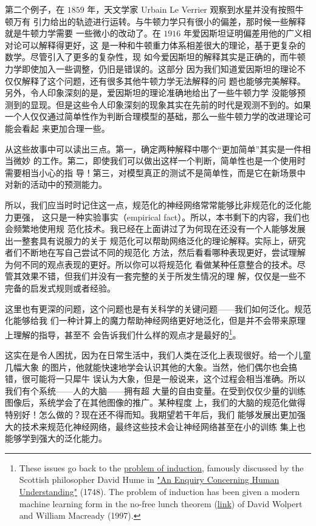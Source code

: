 第二个例子，在 $1859$ 年，天文学家 Urbain Le Verrier 观察到水星并没有按照牛顿万有
引力给出的轨迹进行运转。与牛顿力学只有很小的偏差，那时候一些解释就是牛顿力学需要
一些微小的改动了。在 $1916$ 年爱因斯坦证明偏差用他的广义相对论可以解释得更好，这
是一种和牛顿重力体系相差很大的理论，基于更复杂的数学。尽管引入了更多的复杂性，现
如今爱因斯坦的解释其实是正确的，而牛顿力学即使加入一些调整，仍旧是错误的。这部分
因为我们知道爱因斯坦的理论不仅仅解释了这个问题，还有很多其他牛顿力学无法解释的问
题也能够完美解释。另外，令人印象深刻的是，爱因斯坦的理论准确地给出了一些牛顿力学
没能够预测到的显现。但是这些令人印象深刻的现象其实在先前的时代是观测不到的。如果
一个人仅仅通过简单性作为判断合理模型的基础，那么一些牛顿力学的改进理论可能会看起
来更加合理一些。

从这些故事中可以读出三点。第一，确定两种解释中哪个“更加简单”其实是一件相当微妙
的工作。第二，即使我们可以做出这样一个判断，简单性也是一个使用时需要相当小心的指
导！第三，对模型真正的测试不是简单性，而是它在新场景中对新的活动中的预测能力。

所以，我们应当时时记住这一点，规范化的神经网络常常能够比非规范化的泛化能力更强，
这只是一种实验事实（empirical fact）。所以，本书剩下的内容，我们也会频繁地使用规
范化技术。我已经在上面讲过了为何现在还没有一个人能够发展出一整套具有说服力的关于
规范化可以帮助网络泛化的理论解释。实际上，研究者们不断地在写自己尝试不同的规范化
方法，然后看看哪种表现更好，尝试理解为何不同的观点表现的更好。所以你可以将规范化
看做某种任意整合的技术。尽管其效果不错，但我们并没有一套完整的关于所发生情况的理
解，仅仅是一些不完备的启发式规则或者经验。

这里也有更深的问题，这个问题也是有关科学的关键问题——我们如何泛化。规范化能够给我
们一种计算上的魔力帮助神经网络更好地泛化，但是并不会带来原理上理解的指导，甚至不
会告诉我们什么样的观点才是最好的\footnote{These issues go back to the
  \href{http://en.wikipedia.org/wiki/Problem_of_induction}{problem of
    induction}, famously discussed by the Scottish philosopher David Hume in
  \href{http://www.gutenberg.org/ebooks/9662}{"An Enquiry Concerning Human
    Understanding"} (1748). The problem of induction has been given a modern
  machine learning form in the no-free lunch theorem
  (\href{http://ieeexplore.ieee.org/xpl/articleDetails.jsp?tp=&arnumber=585893}{link})
  of David Wolpert and William Macready (1997).}。

这实在是令人困扰，因为在日常生活中，我们人类在泛化上表现很好。给一个儿童几幅大象
的图片，他就能快速地学会认识其他的大象。当然，他们偶尔也会搞错，很可能将一只犀牛
误认为大象，但是一般说来，这个过程会相当准确。所以我们有个系统——人的大脑——拥有超
大量的自由变量。在受到仅仅少量的训练图像后，系统学会了在其他图像的推广。某种程度
上，我们的大脑的规范化做得特别好！怎么做的？现在还不得而知。我期望若干年后，我们
能够发展出更加强大的技术来规范化神经网络，最终这些技术会让神经网络甚至在小的训练
集上也能够学到强大的泛化能力。

